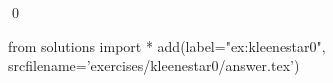 
\begin{ex} 
  \label{ex:kleenestar0}
  
  \qed
\end{ex} 
\begin{python0}
from solutions import *
add(label="ex:kleenestar0",
    srcfilename='exercises/kleenestar0/answer.tex') 
\end{python0}
